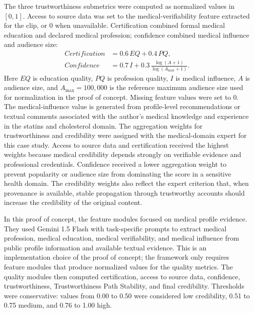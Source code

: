 \documentclass[sigconf, nonacm]{acmart}
\begin{document}
The three trustworthiness submetrics were computed as normalized values in
$[0,1]$. Access to source data was set to the medical-verifiability feature
extracted for the clip, or 0 when unavailable. Certification combined formal
medical education and declared medical profession; confidence combined medical
influence and audience size:
\begin{align*}
  Certification &= 0.6\,EQ + 0.4\,PQ,\\
  Confidence &= 0.7\,I + 0.3\,\frac{\log(A+1)}{\log(A_{\max}+1)}.
\end{align*}
Here $EQ$ is education quality, $PQ$ is profession quality, $I$ is medical
influence, $A$ is audience size, and $A_{\max}=100{,}000$ is the reference
maximum audience size used for normalization in the proof of concept. Missing
feature values were set to 0. The medical-influence value is generated from
profile-level recommendations or textual comments associated with the author's
medical knowledge and experience in the statins and cholesterol domain. The
aggregation weights for trustworthiness and
credibility were assigned with the medical-domain expert for this case study.
Access to source data and certification received the highest weights because
medical credibility depends strongly on verifiable evidence and professional
credentials. Confidence received a lower aggregation weight to prevent popularity
or audience size from dominating the score in a sensitive health domain. The
credibility weights also reflect the expert criterion that, when provenance is
available, stable propagation through trustworthy accounts should increase the
credibility of the original content.

In this proof of concept, the feature modules focused on medical profile evidence. They
used Gemini 1.5 Flash with task-specific prompts to extract medical profession,
medical education, medical verifiability, and medical influence from public
profile information and available textual evidence. This is an implementation
choice of the proof of concept; the framework only requires feature modules that
produce normalized values for the quality metrics.
The quality modules then computed certification, access to source data, confidence,
trustworthiness, Trustworthiness Path Stability, and final credibility. Thresholds
were conservative: values from 0.00 to 0.50 were considered low credibility,
0.51 to 0.75 medium, and 0.76 to 1.00 high.
\end{document}

